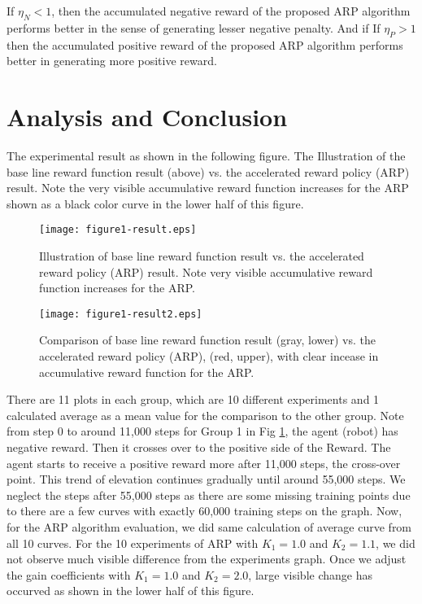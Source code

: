 \documentclass[conference]{IEEEtran}
\begin{document}
If $\eta_N < 1$, then the accumulated negative reward
of the proposed ARP algorithm performs better in 
the sense of 
generating lesser negative penalty. And if 
If $\eta_P > 1$
then the accumulated positive reward
of the proposed ARP algorithm performs better in 
generating more positive reward.
 
\section{Analysis and Conclusion} 
The experimental result as shown in the following 
figure. The Illustration of the base line reward function
result (above) vs. the accelerated reward policy (ARP)
result. Note the very visible accumulative reward function 
increases for the ARP shown as a black color curve
in the lower half of this figure.

\begin{figure}[H] 
\centering
\texttt{[image: figure1-result.eps]} 
\caption{Illustration of base line reward function
result vs. the accelerated reward policy (ARP)
result. Note very visible accumulative reward function 
increases for the ARP.}
\label{figure1-result} 
\end{figure}

\begin{figure}[H] 
\centering
\texttt{[image: figure1-result2.eps]} 
\caption{Comparison of base line reward function
result (gray, lower) vs. the accelerated reward policy (ARP), 
(red, upper), 
with clear incease in  
accumulative reward function for the ARP.}
\label{figure1-result2} 
\end{figure}
There are 11 plots in each group, which are 10
different experiments and 1 calculated average as a 
mean value for the comparison to the other group.  
Note from step 0 to around 11,000 steps for Group 1
in Fig \ref{figure1-result}, 
the agent (robot) has negative reward. Then it
crosses over to the positive side of the Reward. 
The agent starts to receive a positive reward more after 11,000 
steps, the cross-over point. This trend of elevation continues 
gradually until around 55,000 steps. 
We neglect the steps after 55,000 steps as there are some missing 
training points due to 
there are a few curves with exactly 60,000 training steps on the 
graph.
Now, for the ARP algorithm evaluation,
we did same calculation of average curve from all 10 curves. 
For the 10 experiments of ARP 
with $K_1 =1.0$ and $K_2 =1.1$, we did not 
observe much visible difference from the experiments graph. 
Once we adjust the gain coefficients with $K_1 =1.0$ and 
$K_2 =2.0$, large visible change 
has occurved as shown in the lower half of this figure. 
\end{document}
